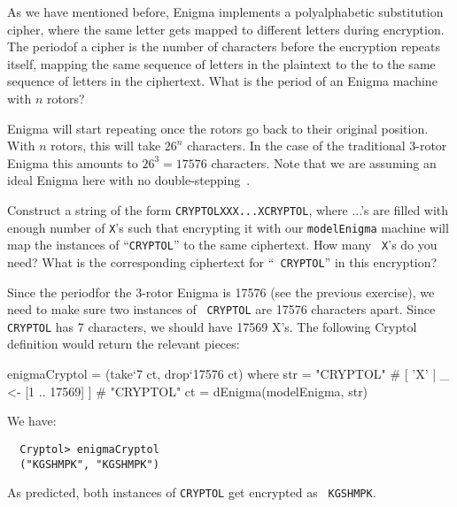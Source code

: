 \begin{Exercise}\label{ex:enigma:10}
  As we have mentioned before, Enigma implements a polyalphabetic
  substitution cipher\indPolyAlphSubst, where the same letter gets
  mapped to different letters during encryption. The
  period\indSubstPeriod of a cipher is the number of characters before
  the encryption repeats itself, mapping the same sequence of letters
  in the plaintext to the to the same sequence of letters in the
  ciphertext. What is the period of an Enigma machine with $n$ rotors?
\end{Exercise}
\begin{Answer}
  Enigma will start repeating once the rotors go back to their
  original position.  With $n$ rotors, this will take $26^n$
  characters. In the case of the traditional 3-rotor Enigma this
  amounts to $26^3 = 17576$ characters. Note that we are assuming an
  ideal Enigma here with no double-stepping~\cite{enigmaAnomaly}.
\end{Answer}

\begin{Exercise}\label{ex:enigma:11}
  Construct a string of the form {\tt CRYPTOLXXX...XCRYPTOL}, where
  ...'s are filled with enough number of {\tt X}'s such that
  encrypting it with our {\tt modelEnigma} machine will map the
  instances of ``{\tt CRYPTOL}'' to the same ciphertext. How many {\tt
    X}'s do you need? What is the corresponding ciphertext for ``{\tt
    CRYPTOL}'' in this encryption?
\end{Exercise}
\begin{Answer}
  Since the period\indSubstPeriod for the 3-rotor Enigma is 17576 (see
  the previous exercise), we need to make sure two instances of {\tt
    CRYPTOL} are 17576 characters apart. Since {\tt CRYPTOL} has 7
  characters, we should have 17569 X's. The following Cryptol
  definition would return the relevant pieces:
\begin{code}
  enigmaCryptol = (take`{7} ct, drop`{17576} ct)
    where   str = "CRYPTOL" # [ 'X' | _ <- [1 .. 17569] ] 
                  # "CRYPTOL"
            ct  = dEnigma(modelEnigma, str)
\end{code}
We have:
\begin{Verbatim}
  Cryptol> enigmaCryptol
  ("KGSHMPK", "KGSHMPK")
\end{Verbatim}
As predicted, both instances of {\tt CRYPTOL} get encrypted as {\tt
  KGSHMPK}.
\end{Answer}

